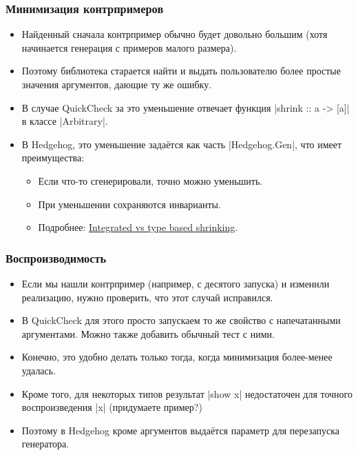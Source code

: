 \documentclass[11pt]{beamer}
\begin{document}
\begin{frame}[fragile]
  \frametitle{Минимизация контрпримеров}
  \begin{itemize}
    \item Найденный сначала контрпример обычно будет довольно большим (хотя начинается генерация с примеров малого размера).
    \item Поэтому библиотека старается найти и выдать пользователю более простые значения аргументов, дающие ту же ошибку.
    \item В случае QuickCheck за это уменьшение отвечает функция \haskinline|shrink :: a -> [a]| в классе \haskinline|Arbitrary|.
    \item В Hedgehog, это уменьшение задаётся как часть \haskinline|Hedgehog.Gen|, что имеет преимущества:
          \begin{itemize}
            \item Если что-то сгенерировали, точно можно уменьшить.
            \item При уменьшении сохраняются инварианты.
            \item Подробнее: \href{https://hypothesis.works/articles/integrated-shrinking/}{Integrated vs type based shrinking}.
          \end{itemize}
  \end{itemize}
\end{frame}

\begin{frame}[fragile]
  \frametitle{Воспроизводимость}
  \begin{itemize}
    \item Если мы нашли контрпример (например, с десятого запуска) и изменили реализацию, нужно проверить, что этот случай исправился.
    \item В QuickCheck для этого просто запускаем то же свойство с напечатанными аргументами. Можно также добавить обычный тест с ними.
    \item Конечно, это удобно делать только тогда, когда минимизация более-менее удалась.
    \item Кроме того, для некоторых типов результат \haskinline|show x| недостаточен для точного воспроизведения \haskinline|x| (придумаете пример?)
    \item Поэтому в Hedgehog кроме аргументов выдаётся параметр для перезапуска генератора.
  \end{itemize}
\end{frame}
\end{document}
